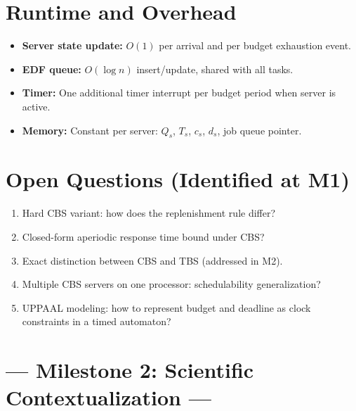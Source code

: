 \documentclass[conference]{IEEEtran}
\begin{document}
\section{Runtime and Overhead}

\begin{itemize}
  \item \textbf{Server state update:} $O(1)$ per arrival and per budget
        exhaustion event.
  \item \textbf{EDF queue:} $O(\log n)$ insert/update, shared with all
        tasks.
  \item \textbf{Timer:} One additional timer interrupt per budget period
        when server is active.
  \item \textbf{Memory:} Constant per server: $Q_s$, $T_s$, $c_s$,
        $d_s$, job queue pointer.
\end{itemize}

\section{Open Questions (Identified at M1)}

\begin{enumerate}
  \item Hard CBS variant: how does the replenishment rule differ?
  \item Closed-form aperiodic response time bound under CBS?
  \item Exact distinction between CBS and TBS (addressed in M2).
  \item Multiple CBS servers on one processor: schedulability
        generalization?
  \item UPPAAL modeling: how to represent budget and deadline as
        clock constraints in a timed automaton?
\end{enumerate}


\section*{--- Milestone 2: Scientific Contextualization ---}

\end{document}

